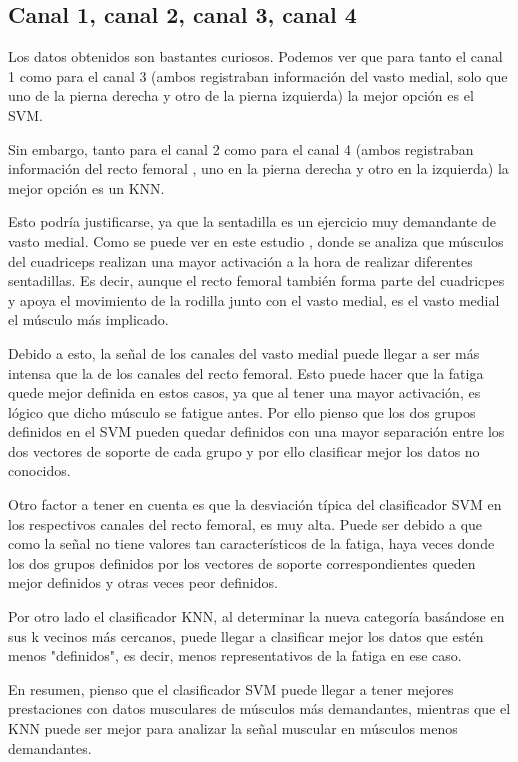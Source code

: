 \subsection{Canal 1, canal 2, canal 3, canal 4}
Los datos obtenidos son bastantes curiosos. Podemos ver que para tanto el canal 1 como para el canal 3 (ambos registraban información del vasto medial, solo que uno de la pierna derecha y otro de la pierna izquierda) la mejor opción es el SVM.

Sin embargo, tanto para el canal 2 como para el canal 4 (ambos registraban información del recto femoral , uno en la pierna derecha y otro en la izquierda) la mejor opción es un KNN. 


Esto podría justificarse, ya que la sentadilla es un ejercicio muy demandante de vasto medial. Como se puede ver en este estudio \cite{muyor2020actividad}, donde se analiza que músculos del cuadriceps realizan una mayor activación a la hora de realizar diferentes sentadillas. Es decir, aunque el recto femoral también forma parte del cuadricpes y apoya el movimiento de la rodilla junto con el vasto medial, es el vasto medial el músculo más implicado.

Debido a esto, la señal de los canales del vasto medial puede llegar a ser más intensa que la de los canales del recto femoral. Esto puede hacer que la fatiga quede mejor definida en estos casos, ya que al tener una mayor activación, es lógico que dicho músculo se fatigue antes. Por ello pienso que los dos grupos definidos en el SVM pueden quedar definidos con una mayor separación entre los dos vectores de soporte de cada grupo y por ello clasificar mejor los datos no conocidos.

Otro factor a tener en cuenta es que la desviación típica del clasificador SVM en los respectivos canales del recto femoral, es muy alta. Puede ser debido a que como la señal no tiene valores tan característicos de la fatiga, haya veces donde los dos grupos definidos por los vectores de soporte correspondientes queden mejor definidos y otras veces peor definidos.


Por otro lado el clasificador KNN, al determinar la nueva categoría basándose en sus k vecinos más cercanos, puede llegar a clasificar mejor los datos que estén menos "definidos", es decir, menos representativos de la fatiga en ese caso.

En resumen, pienso que el clasificador SVM puede llegar a tener mejores prestaciones con datos musculares de músculos más demandantes, mientras que el KNN puede ser mejor para analizar la señal muscular en músculos menos demandantes.

